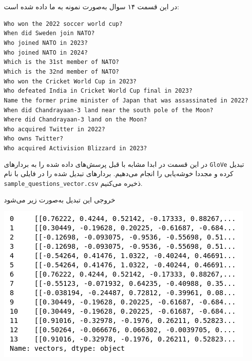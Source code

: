 \begin{enumerate}
	
	
	
	
	
	\begin{qsolve}
		در این قسمت ۱۴ سوال به‌صورت نمونه به ما داده شده است:
		
		\begin{latin}
			\texttt{Who won the 2022 soccer world cup?}\\
			\texttt{When did Sweden join NATO?}\\
			\texttt{Who joined NATO in 2023?}\\
			\texttt{Who joined NATO in 2024?}\\
			\texttt{Which is the 31st member of NATO?}\\
			\texttt{Which is the 32nd member of NATO?}\\
			\texttt{Who won the Cricket World Cup in 2023?}\\
			\texttt{Who defeated India in Cricket World Cup final in 2023?}\\
			\texttt{Name the former prime minister of Japan that was assassinated in 2022?}\\
			\texttt{When did Chandrayaan-3 land near the south pole of the Moon?}\\
			\texttt{Where did Chandrayaan-3 land on the Moon?}\\
			\texttt{Who acquired Twitter in 2022?}\\
			\texttt{Who owns Twitter?}\\
			\texttt{Who acquired Activision Blizzard in 2023?}
		\end{latin}
		
		
		در این قسمت در ابدا مشابه با قبل پرسش‌های داده شده را به بردار‌های \texttt{GloVe} تبدیل کرده و مجددا خوشه‌یابی را انجام می‌دهیم. بردار‌های تبدیل شده را در فایلی با نام \texttt{sample\_questions\_vector.csv} ذخیره می‌کنیم.
	
	
	خروجی این تبدیل به‌صورت زیر می‌شود
	\end{qsolve}
	
	
	
	
	\begin{qsolve}
		\begin{center}
			\includegraphics*[width=0.6\linewidth]{pics/img23.png}
			\label{تبدیل سوالات به بردار}
		\end{center}
		

\end{qsolve}
\end{enumerate}
